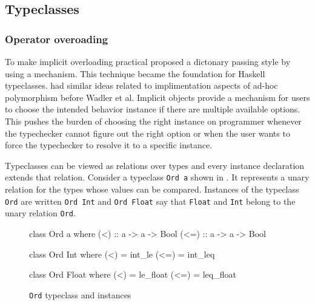\documentclass[manuscript,screen,nonacm]{acmart}
\begin{document}
\subsection{Typeclasses}
\subsubsection{Operator overoading}
To make implicit overloading practical \citet{wadler_polymorphism_1989} proposed a dictonary passing style by using a mechanism. This technique became the foundation for Haskell\cite{haskell_2010} typeclasses. \cite{kaes_parametric_1988} had similar ideas related to implimentation aspects of ad-hoc polymorphism before Wadler et al. Implicit objects\cite{oliveira_typeclasses_2010} provide a mechanism for users to choose the intended behavior instance if there are multiple available options. This pushes the burden of choosing the right instance on programmer whenever the typechecker cannot figure out the right option or when the user wants to force the typechecker to resolve it to a specific instance.

Typeclasses can be viewed as relations over types and every instance declaration extends that relation. Consider a typeclass \lstinline{Ord a} shown in . It represents a unary relation for the types whose values can be compared. Instances of the typeclass \lstinline{Ord} are written \lstinline{Ord Int} and \lstinline{Ord Float} say that \lstinline{Float} and \lstinline{Int} belong to the unary relation \lstinline{Ord}.


\begin{figure}[ht]
  \centering
  \begin{minipage}[ht]{0.3\linewidth}
    \begin{code}
      class Ord a where
         (<)  :: a -> a -> Bool
         (<=) :: a -> a -> Bool
    \end{code}
  \end{minipage}%
  \begin{minipage}[ht]{0.3\linewidth}
    \begin{code}
      class Ord Int where
         (<)  = int_le
         (<=) = int_leq
    \end{code}
  \end{minipage}%
  \begin{minipage}[ht]{0.3\linewidth}
    \begin{code}
      class Ord Float where
         (<)  = le_float
         (<=) = leq_float
    \end{code}
  \end{minipage}
  \caption{\lstinline{Ord} typeclass and instances}
  \label{fig:tc-ord}
\end{figure}
\end{document}
